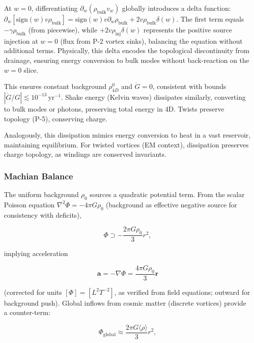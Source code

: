 At $w=0$, differentiating $\partial_w (\rho_{\text{bulk}} v_w)$ globally introduces a delta function: $\partial_w [\text{sign}(w) v \rho_{\text{bulk}}] = \text{sign}(w) v \partial_w \rho_{\text{bulk}} + 2 v \rho_{\text{bulk}} \delta(w)$. The first term equals $-\gamma \rho_{\text{bulk}}$ (from piecewise), while $+2 v \rho_{\text{inj}} \delta(w)$ represents the positive source injection at $w=0$ (flux from P-2 vortex sinks), balancing the equation without additional terms. Physically, this delta encodes the topological discontinuity from drainage, ensuring energy conversion to bulk modes without back-reaction on the $w=0$ slice.

This ensures constant background $\rho_{4D}^0$ and $\dot{G} = 0$, consistent with bounds $|\dot{G}/G| \lesssim 10^{-13} \, \mathrm{yr}^{-1}$. Shake energy (Kelvin waves) dissipates similarly, converting to bulk modes or photons, preserving total energy in 4D. Twists preserve topology (P-5), conserving charge.

Analogously, this dissipation mimics energy conversion to heat in a vast reservoir, maintaining equilibrium. For twisted vortices (EM context), dissipation preserves charge topology, as windings are conserved invariants.

\subsubsection{Machian Balance}
The uniform background $\rho_0$ sources a quadratic potential term. From the scalar Poisson equation $\nabla^2 \Phi = -4\pi G \rho_0$ (background as effective negative source for consistency with deficits),

\begin{equation}
\Phi \supset -\frac{2\pi G \rho_0}{3} r^2,
\end{equation}

implying acceleration

\begin{equation}
\mathbf{a} = -\nabla \Phi = \frac{4\pi G \rho_0}{3} \mathbf{r}
\end{equation}

(corrected for units $[\Phi] = [L^2 T^{-2}]$, as verified from field equations; outward for background push). Global inflows from cosmic matter (discrete vortices) provide a counter-term:

\begin{equation}
\Phi_{\text{global}} \approx \frac{2\pi G \langle \rho \rangle}{3} r^2,
\end{equation}


